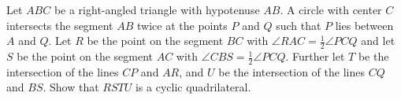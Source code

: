Let $ABC$ be a right-angled triangle with hypotenuse $AB$. A circle with center $C$ intersects the segment $AB$ twice at the points $P$ and $Q$ such that $P$ lies between $A$ and $Q$. Let $R$ be the point on the segment $BC$ with $\angle RAC = \frac{1}{2}\angle PCQ$ and let $S$ be the point on the segment $AC$ with $\angle CBS = \frac{1}{2}\angle PCQ$. Further let $T$ be the intersection of the lines $CP$ and $AR$, and $U$ be the intersection of the lines $CQ$ and $BS$. Show that $RSTU$ is a cyclic quadrilateral.